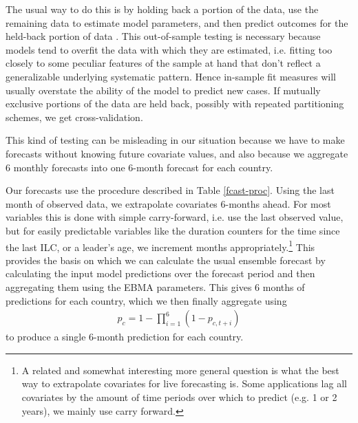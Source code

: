 \documentclass[pdftex,11pt]{article}
\begin{document}
The usual way to do this is by holding back a portion of the data, use the remaining data to estimate model parameters, and then predict outcomes for the held-back portion of data \citep{ward:greenhill:bakke:2010}. This out-of-sample testing is necessary because models tend to overfit the data with which they are estimated, i.e. fitting too closely to some peculiar features of the sample at hand that don't reflect a generalizable underlying systematic pattern. Hence in-sample fit measures will usually overstate the ability of the model to predict new cases. If mutually exclusive portions of the data are held back, possibly with repeated partitioning schemes, we get cross-validation. 

This kind of testing can be misleading in our situation because we have to make forecasts without knowing future covariate values, and also because we aggregate 6 monthly forecasts into one 6-month forecast for each country. 

Our forecasts use the procedure described in Table \ref{fcast-proc}. Using the last month of observed data, we extrapolate covariates 6-months ahead. For most variables this is done with simple carry-forward, i.e. use the last observed value, but for easily predictable variables like the duration counters for the time since the last ILC, or a leader's age, we increment months appropriately.\footnote{A related and somewhat interesting more general question is what the best way to extrapolate covariates for live forecasting is. Some applications lag all covariates by the amount of time periods over which to predict (e.g. 1 or 2 years), we mainly use carry forward.} This provides the basis on which we can calculate the usual ensemble forecast by calculating the input model predictions over the forecast period and then aggregating them using the EBMA parameters. This gives 6 months of predictions for each country, which we then finally aggregate using 
\begin{eqnarray}
p_c = 1 - \prod_{i=1}^{6} (1 - p_{c, t+i})
\end{eqnarray} 
to produce a single 6-month prediction for each country.
\end{document}
